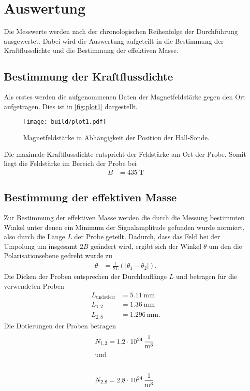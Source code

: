 \section{Auswertung}
\label{sec:Auswertung}

Die Messwerte werden nach der chronologischen Reihenfolge der Durchführung ausgewertet. Dabei wird die Auswertung aufgeteilt
in die Bestimmung der Kraftflussdichte und die Bestimmung der effektiven Masse.

\subsection{Bestimmung der Kraftflussdichte}
\label{sub:Kraftflussdichte}

Als erstes werden die aufgenommenen Daten der Magnetfeldstärke gegen den Ort aufgetragen.
Dies ist in \autoref{fig:plot1} dargestellt.
\begin{figure}[H]
  \centering
  \texttt{[image: build/plot1.pdf]}
  \caption {Magnetfeldstärke in Abhängigkeit der Position der Hall-Sonde.}
  \label{fig:plot1}
\end{figure}


Die maximale Kraftflussdichte entspricht der Feldstärke am Ort der Probe.
Somit liegt die Feldstärke im Bereich der Probe bei 
\begin{align*}
  B &= \qty{435}{\tesla}
\end{align*}

\subsection{Bestimmung der effektiven Masse}
\label{sub:effektiveMasse}

Zur Bestimmung der effektiven Masse werden die durch die Messung bestimmten Winkel unter denen ein Minimum der Signalamplitude gefunden wurde
normiert, also durch die Länge $L$ der Probe geteilt.
Dadurch, dass das Feld bei der Umpolung um insgesamt $\num{2}B$ geändert wird, ergibt sich der Winkel $\theta$ um den die Polarisationsebene
gedreht wurde zu
\begin{align}
  \theta &= \frac{1}{2L}(\lvert \theta_1-\theta_2 \rvert).
\end{align}
Die Dicken der Proben entsprechen der Durchlauflänge $L$ und betragen für die verwendeten Proben
\begin{align*}
  L_{\text{undotiert}}&= \qty{5.11}{\milli\meter}\\
  L_{1,2}&= \qty{1.36}{\milli\meter}\\
  L_{2,8}&= \qty{1.296}{\milli\meter}.
\end{align*}
Die Dotierungen der Proben betragen
\begin{align*}
  N_{1,2}&= \qty{1.2 e24}{\per\cubic\meter}\\
  \shortintertext{und}\\
  N_{2,8}&= \qty{2.8 e24}{\per\cubic\meter}.
\end{align*}

